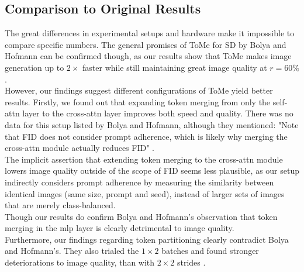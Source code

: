 \subsection{Comparison to Original Results}
The great differences in experimental setups and hardware make it impossible to compare specific numbers. The general promises of ToMe for SD by Bolya and Hofmann can be confirmed though, as our results show that ToMe makes image generation up to $2 \times$ faster while still maintaining great image quality at \(r = 60\%\).\\
However, our findings suggest different configurations of ToMe yield better results.
Firstly, we found out that expanding token merging from only the self-attn layer to the cross-attn layer improves both speed and quality. There was no data for this setup listed by Bolya and Hofmann, although they mentioned: "Note that FID does not consider prompt adherence, which is likely why merging the cross-attn module actually reduces FID" \cite{bolya2023tomesd}. \\
The implicit assertion that extending token merging to the cross-attn module lowers image quality outside of the scope of FID seems less plausible, as our setup indirectly considers prompt adherence by measuring the similarity between identical images (same size, prompt and seed), instead of larger sets of images that are merely class-balanced.\\
Though our results do confirm Bolya and Hofmann's observation that token merging in the mlp layer is clearly detrimental to image quality.\\
Furthermore, our findings regarding token partitioning clearly contradict Bolya and Hofmann's. They also trialed the $1 \times 2$ batches and found stronger deteriorations to image quality, than with $2 \times 2$ strides \cite[Tab.~2 (a)]{bolya2023tomesd}.
